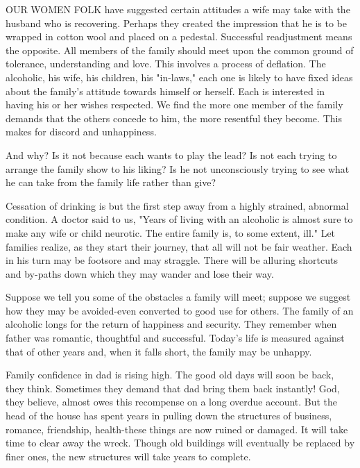 
\bbChapterPreamble


\begin{biblechapter}
    OUR WOMEN FOLK have suggested certain attitudes a wife may take with the husband who is recovering.  Perhaps they created the impression that he is to be wrapped in cotton wool and placed on a pedestal.  Successful readjustment means the opposite.  All members of the family should meet upon the common ground of tolerance, understanding and love.  This involves a process of deflation.  The alcoholic, his wife, his children, his "in-laws," each one is likely to have fixed ideas about the family's attitude towards himself or herself.  Each is interested in having his or her wishes respected.  We find the more one member of the family demands that the others concede to him, the more resentful they become.  This makes for discord and unhappiness.

And why?  Is it not because each wants to play the lead?  Is not each trying to arrange the family show to his liking?  Is he not unconsciously trying to see what he can take from the family life rather than give?

Cessation of drinking is but the first step away from a highly strained, abnormal condition.  A doctor said to us, "Years of living with an alcoholic is almost sure to make any wife or child neurotic.  The entire family is, to some extent, ill."  Let families realize, as they start their journey, that all will not be fair weather.  Each in his turn may be footsore and may straggle.  There will be alluring shortcuts and by-paths down which they may wander and lose their way.

Suppose we tell you some of the obstacles a family will meet; suppose we suggest how they may be avoided-even converted to good use for others.  The family of an alcoholic longs for the return of happiness and security.  They remember when father was romantic, thoughtful and successful.  Today's life is measured against that of other years and, when it falls short, the family may be unhappy.

Family confidence in dad is rising high.  The good old days will soon be back, they think.  Sometimes they demand that dad bring them back instantly!  God, they believe, almost owes this recompense on a long overdue account.  But the head of the house has spent years in pulling down the structures of business, romance, friendship, health-these things are now ruined or damaged.  It will take time to clear away the wreck.  Though old buildings will eventually be replaced by finer ones, the new structures will take years to complete.


\end{biblechapter}

